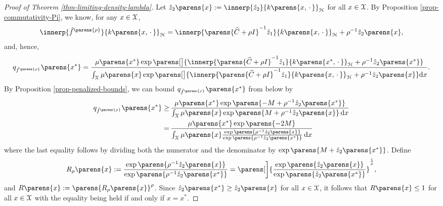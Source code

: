 \begin{proof}[Proof of Theorem \ref{thm-limiting-density-lambda}]
	Let $\hat{z}_2 \parens{x} := \innerp{\hat{z}_2}{ k \parens{x, \,\cdot\,}}_{\calH}$ for all $x \in \mathcal{X}$. By Proposition \ref{prop-commutativity-Pi}, we know, for any $x \in \mathcal{X}$, 
	\begin{align*}
		\innerp{\hat{f}^{\parens{\rho}}}{k \parens{x, \,\cdot\,}}_{\calH} = \innerp{\parens{\widehat{C} + \rho I}^{-1} \hat{z}_1}{k \parens{x, \,\cdot\,}}_{\calH} + \rho^{-1} \hat{z}_2 \parens{x}, 
	\end{align*}
	and, hence, 
	\begin{align*}
		q_{\hat{f}^{\parens{\rho}}} \parens{x^*} = \frac{\mu \parens{x^*} \exp \parens[\big]{\innerp{\parens{\widehat{C} + \rho I}^{-1} \hat{z}_1}{k \parens{x^*, \,\cdot\,}}_{\calH} + \rho^{-1} \hat{z}_2 \parens{x^*} }}{\int_{\calX} \mu \parens{x} \exp \parens[\big]{ \innerp{\parens{\widehat{C} + \rho I}^{-1} \hat{z}_1}{k \parens{x, \,\cdot\,}}_{\calH} + \rho^{-1} \hat{z}_2 \parens{x} } \diff x}. 
	\end{align*}
	By Proposition \ref{prop-penalized-bounds}, we can bound $q_{\hat{f}^{\parens{\rho}}} \parens{x^*}$ from below by 
	\begin{align}
		q_{\hat{f}^{\parens{\rho}}} \parens{x^*} \ge & \, \frac{\mu \parens{x^*} \exp \parens{- M + \rho^{-1} \hat{z}_2 \parens{x^*} }}{\int_{\calX} \mu \parens{x}\exp \parens{M + \rho^{-1} \hat{z}_2 \parens{x} } \, \diff x} \nonumber \\ 
		= & \, \frac{\mu \parens{x^*} \exp \parens{-2M} }{\int_{\calX} \mu \parens{x} \frac{\exp \parens{\rho^{-1} \hat{z}_2 \parens{x} }}{\exp \parens{ \rho^{-1} \hat{z}_2 \parens{x^*} }} \, \diff x} \label{eq-penalized-division}
	\end{align}
	where the last equality follows by dividing both the numerator and the denominator by $\exp\parens{M + \hat{z}_2 \parens{x^*} }$. Define 
	\begin{align*}
		R_{\rho} \parens{x} := \frac{\exp\parens{\rho^{-1} \hat{z}_2 \parens{x} }}{\exp \parens{ \rho^{-1} \hat{z}_2 \parens{x^*} }} = \parens[\bigg]{\frac{\exp \parens{ \hat{z}_2 \parens{x} }}{\exp \parens{\hat{z}_2 \parens{x^*} }}}^{\frac{1}{\rho}}, 
	\end{align*}
	and $R \parens{x} := \parens{R_{\rho} \parens{x}}^{\rho}$. Since $\hat{z}_2 \parens{x^*} \ge \hat{z}_2 \parens{x}$ for all $x \in \mathcal{X}$, it follows that $R \parens{x} \le 1$ for all $x \in \mathcal{X}$ with the equality being held if and only if $x = x^*$. 


\end{proof}
